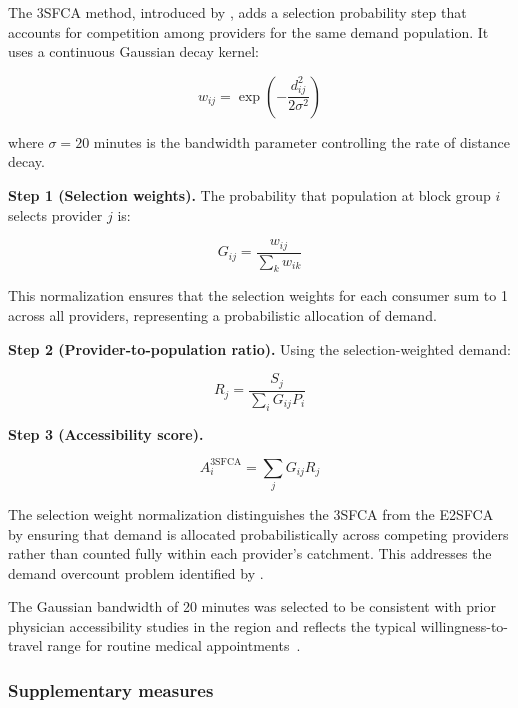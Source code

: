 \documentclass{CUP-JNL-DAP}%
\begin{document}
The 3SFCA method, introduced by \citet{wan2012}, adds a selection probability step that accounts for competition among providers for the same demand population. It uses a continuous Gaussian decay kernel:

\begin{equation}
w_{ij} = \exp\!\left(-\frac{d_{ij}^{2}}{2\sigma^{2}}\right)
\end{equation}

\noindent where $\sigma = 20$ minutes is the bandwidth parameter controlling the rate of distance decay.

\textbf{Step 1 (Selection weights).} The probability that population at block group $i$ selects provider $j$ is:

\begin{equation}
G_{ij} = \frac{w_{ij}}{\displaystyle\sum_{k} w_{ik}}
\end{equation}

\noindent This normalization ensures that the selection weights for each consumer sum to 1 across all providers, representing a probabilistic allocation of demand.

\textbf{Step 2 (Provider-to-population ratio).} Using the selection-weighted demand:

\begin{equation}
R_j = \frac{S_j}{\displaystyle\sum_i G_{ij} P_i}
\end{equation}

\textbf{Step 3 (Accessibility score).}

\begin{equation}
A_i^{\text{3SFCA}} = \sum_j G_{ij} R_j
\end{equation}

The selection weight normalization distinguishes the 3SFCA from the E2SFCA by ensuring that demand is allocated probabilistically across competing providers rather than counted fully within each provider's catchment. This addresses the demand overcount problem identified by \citet{wan2012}.

The Gaussian bandwidth of 20 minutes was selected to be consistent with prior physician accessibility studies in the region and reflects the typical willingness-to-travel range for routine medical appointments~\citep{mcgrail2009}.

\subsubsection{Supplementary measures}
\end{document}
